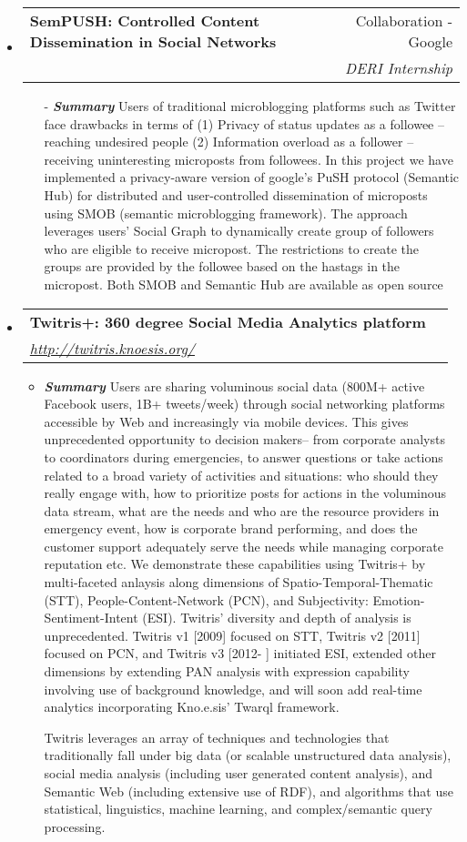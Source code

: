 \documentclass[letterpaper,11pt]{article}
\makeatletter
\newcommand{\ressubheading}[4]{
\begin{tabular*}{7.0in}{l@{\extracolsep{\fill}}r}
		\textbf{#1} & #2 \\
		\textit{#3} & \textit{#4} \\
\end{tabular*}\vspace{-6pt}}
\makeatother
\begin{document}
\begin{itemize}
\item
\ressubheading{SemPUSH: Controlled Content Dissemination in Social Networks}{Collaboration - Google}{}{DERI Internship}
\begin{itemize}
\item[-] \textit{\textbf{Summary}} Users of traditional microblogging platforms such as Twitter face drawbacks in terms of (1) Privacy of status updates as a followee -- reaching undesired people (2) Information overload as a follower -- receiving uninteresting microposts from followees. In this project we have implemented a privacy-aware version of google's PuSH protocol (Semantic Hub) for distributed and user-controlled dissemination of microposts using SMOB (semantic microblogging framework). The approach leverages users' Social Graph to dynamically create group of followers who are eligible to receive micropost. The restrictions to create the groups are provided by the followee based on the hastags in the micropost. Both SMOB and Semantic Hub are available as open source
\end{itemize}


\item
\ressubheading{Twitris+: 360 degree Social Media Analytics platform}{}{\url{http://twitris.knoesis.org/}}{}
\linebreak
\begin{itemize}
    \item \textit{\textbf{Summary}} Users are sharing voluminous social data (800M+ active Facebook users, 1B+ tweets/week) through social networking platforms accessible by Web and increasingly via mobile devices. This gives unprecedented opportunity to decision makers-- from corporate analysts to coordinators during emergencies, to answer questions or take actions related to a broad variety of activities and situations: who should they really engage with, how to prioritize posts for actions in the voluminous data stream, what are the needs and who are the resource providers in emergency event, how is corporate brand performing, and does the customer support adequately serve the needs while managing corporate reputation etc. We demonstrate these capabilities using Twitris+ by multi-faceted anlaysis along dimensions of Spatio-Temporal-Thematic (STT), People-Content-Network (PCN), and Subjectivity: Emotion-Sentiment-Intent (ESI). Twitris' diversity and depth of analysis is unprecedented. Twitris v1 [2009] focused on STT, Twitris v2 [2011] focused on PCN, and Twitris v3 [2012- ] initiated ESI, extended other dimensions by extending PAN analysis with expression capability involving use of background knowledge, and will soon add real-time analytics incorporating Kno.e.sis' Twarql framework.

Twitris leverages an array of techniques and technologies that traditionally fall under big data (or scalable unstructured data analysis), social media analysis (including user generated content analysis), and Semantic Web (including extensive use of RDF), and algorithms that use statistical, linguistics, machine learning, and complex/semantic query processing. 
\end{itemize}
\end{itemize}
\end{document}
